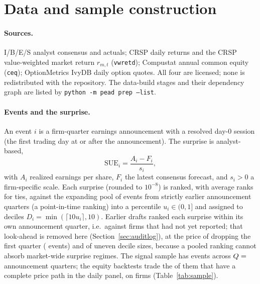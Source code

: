 \documentclass[11pt]{article}
\theoremstyle{definition}
\newcommand{\1}{\mathbf{1}}
\begin{document}
\section{Data and sample construction}\label{sec:data}

\paragraph{Sources.} I/B/E/S analyst consensus and actuals; CRSP daily returns and the CRSP
value-weighted market return $r_{m,t}$ (\texttt{vwretd}); Compustat annual common equity
(\texttt{ceq}); OptionMetrics IvyDB daily option quotes. All four are licensed; none is
redistributed with the repository. The data-build stages and their dependency graph are
listed by \texttt{python -m pead prep --list}.

\paragraph{Events and the surprise.} An event $i$ is a firm-quarter earnings announcement with a
resolved day-0 session (the first trading day at or after the announcement). The surprise is
analyst-based,
\begin{equation}
  \mathrm{SUE}_i=\frac{A_i-F_i}{s_i},
\end{equation}
with $A_i$ realized earnings per share, $F_i$ the latest consensus forecast, and $s_i>0$ a
firm-specific scale. Each surprise (rounded to $10^{-8}$) is ranked, with average ranks for ties, against the expanding pool of events from strictly earlier announcement quarters (a point-in-time ranking) into a percentile $u_i\in(0,1]$ and assigned to deciles
$D_i=\min(\lceil10u_i\rceil,10)$. Earlier drafts ranked each surprise within its own announcement quarter, i.e.\ against firms that had not yet reported; that look-ahead is removed here
(Section~\ref{sec:auditlog}), at the price of dropping the first quarter ( events) and of uneven decile sizes, because a pooled ranking cannot absorb market-wide surprise regimes. The signal sample has  events across $Q=\stv{Q}$
announcement quarters; the equity backtests trade the  of them
that have a complete price path in the daily panel, on  firms (Table~\ref{tab:sample}).
\end{document}

